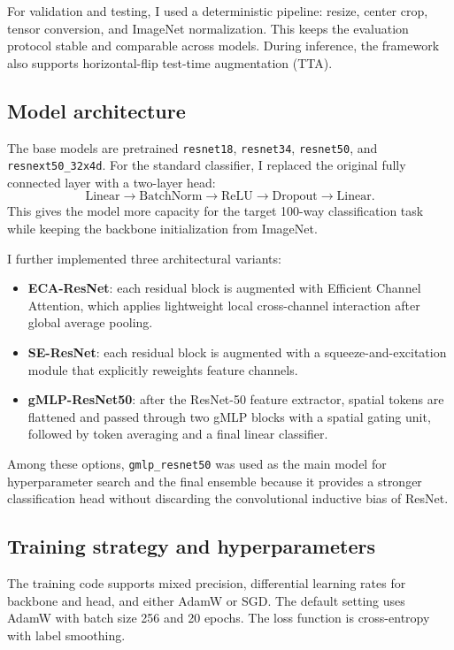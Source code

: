 \documentclass[11pt]{article}
\begin{document}
For validation and testing, I used a deterministic pipeline: resize, center crop, tensor conversion, and ImageNet normalization. This keeps the evaluation protocol stable and comparable across models. During inference, the framework also supports horizontal-flip test-time augmentation (TTA).

\subsection{Model architecture}
The base models are pretrained \texttt{resnet18}, \texttt{resnet34}, \texttt{resnet50}, and \texttt{resnext50\_32x4d}. For the standard classifier, I replaced the original fully connected layer with a two-layer head:
\[
\text{Linear} \rightarrow \text{BatchNorm} \rightarrow \text{ReLU} \rightarrow \text{Dropout} \rightarrow \text{Linear}.
\]
This gives the model more capacity for the target 100-way classification task while keeping the backbone initialization from ImageNet.

I further implemented three architectural variants:
\begin{itemize}[leftmargin=1.5em]
\item \textbf{ECA-ResNet}: each residual block is augmented with Efficient Channel Attention, which applies lightweight local cross-channel interaction after global average pooling.
\item \textbf{SE-ResNet}: each residual block is augmented with a squeeze-and-excitation module that explicitly reweights feature channels.
\item \textbf{gMLP-ResNet50}: after the ResNet-50 feature extractor, spatial tokens are flattened and passed through two gMLP blocks with a spatial gating unit, followed by token averaging and a final linear classifier.
\end{itemize}

Among these options, \texttt{gmlp\_resnet50} was used as the main model for hyperparameter search and the final ensemble because it provides a stronger classification head without discarding the convolutional inductive bias of ResNet.

\subsection{Training strategy and hyperparameters}
The training code supports mixed precision, differential learning rates for backbone and head, and either AdamW or SGD. The default setting uses AdamW with batch size 256 and 20 epochs. The loss function is cross-entropy with label smoothing.
\end{document}
